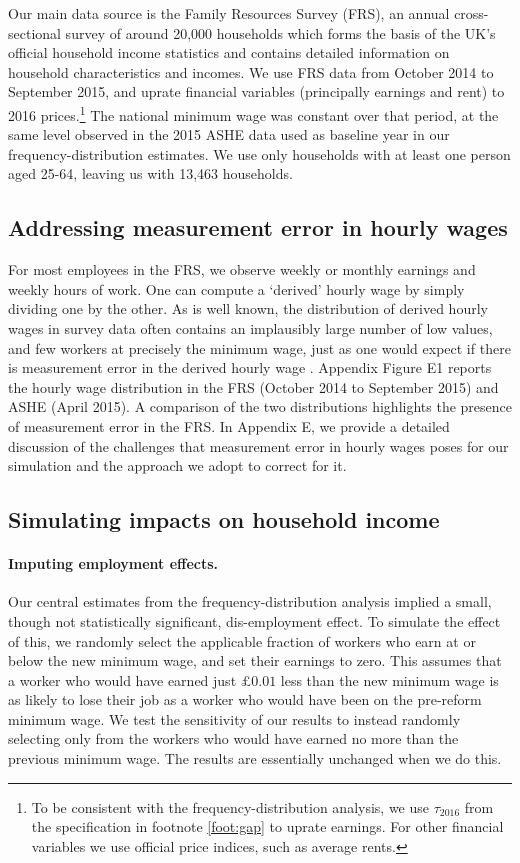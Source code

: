 Our main data source is the Family Resources Survey (FRS), an annual cross-sectional survey of around 20,000 households which forms the basis of the UK's official household income statistics and contains detailed information on household characteristics and incomes. We use FRS data from October 2014 to September 2015, and uprate financial variables (principally earnings and rent) to 2016 prices.\footnote{To be consistent with the frequency-distribution analysis, we use $\tau_{2016}$ from the specification in footnote \ref{foot:gap} to uprate earnings. For other financial variables we use official price indices, such as average rents.} The national minimum wage was constant over that period, at the same level observed in the 2015 ASHE data used as baseline year in our frequency-distribution estimates. We use only households with at least one person aged 25-64, leaving us with 13,463 households.

\subsection{Addressing measurement error in hourly wages} \label{sec:hh_imputinghourlywages}

For most employees in the FRS, we observe weekly or monthly earnings and weekly hours of work. One can compute a `derived' hourly wage by simply dividing one by the other. As is well known, the distribution of derived hourly wages in survey data often contains an implausibly large number of low values, and few  workers at precisely the minimum wage, just as one would expect if there is measurement error in the derived hourly wage \citep{Skinner2002}. Appendix Figure E1 reports the hourly wage distribution in the FRS (October 2014 to September 2015) and ASHE (April 2015). A comparison of the two distributions highlights the presence of measurement error in the FRS. In Appendix E, we provide a detailed discussion of the challenges that measurement error in hourly wages poses for our simulation and the approach we adopt to correct for it. 

\subsection{Simulating impacts on household income} \label{sec:hh_simulation}

\paragraph{Imputing employment effects.} Our central estimates from the frequency-distribution analysis implied a small, though not statistically significant, dis-employment effect. To simulate the effect of this, we randomly select the applicable fraction of workers who earn at or below the new minimum wage, and set their earnings to zero. This assumes that a worker who would have earned just $\pounds0.01$ less than the new minimum wage is as likely to lose their job as a worker who would have been on the pre-reform minimum wage. We test the sensitivity of our results to instead randomly selecting only from the workers who would have earned no more than the previous minimum wage. The results are essentially unchanged when we do this. 

